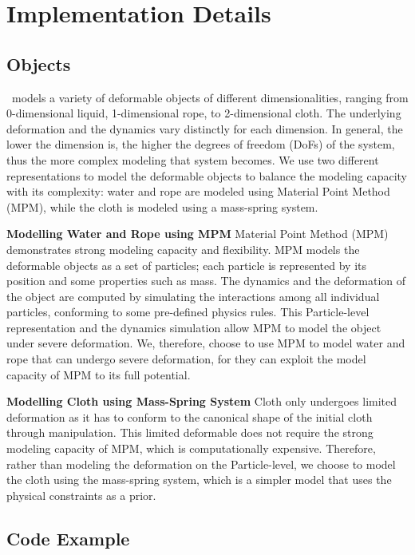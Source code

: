 \section{Implementation Details}

\subsection{Objects}
\label{sec:object_model}
\algo\ models a variety of deformable objects of different dimensionalities, ranging from 0-dimensional  liquid, 1-dimensional rope, to 2-dimensional cloth. The underlying deformation and the dynamics vary distinctly for each dimension. In general, the lower the dimension is, the higher the degrees of freedom (DoFs) of the system, thus the more complex modeling that system becomes. 
We use two different representations to model the deformable objects to balance the modeling capacity with its complexity: water and rope are modeled using Material Point Method (MPM), while the cloth is modeled using a mass-spring system. 

\textbf{Modelling Water and Rope using MPM} Material Point Method (MPM) demonstrates strong modeling capacity and flexibility. MPM models the deformable objects as a set of particles; each particle is represented by its position and some properties such as mass. The dynamics and the deformation of the object are computed by simulating the interactions among all individual particles, conforming to some pre-defined physics rules. This Particle-level representation and the dynamics simulation allow MPM to model the object under severe deformation. We, therefore, choose to use MPM to model water and rope that can undergo severe deformation, for they can exploit the model capacity of MPM to its full potential.

\textbf{Modelling Cloth using Mass-Spring System} Cloth only undergoes limited deformation as it has to conform to the canonical shape of the initial cloth through manipulation. This limited deformable does not require the strong modeling capacity of MPM, which is computationally expensive. Therefore, rather than modeling the deformation on the Particle-level, we choose to model the cloth using the mass-spring system, which is a simpler model that uses the physical constraints as a prior. 



\subsection{Code Example}
\label{sec:code_example}

